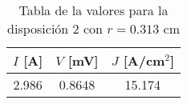 \begin{table}[h!]
    \centering
\begin{tabular}{ccc}
\toprule
$I$ [A] & $V$ [mV] & $J$ [A/cm$^2$] \\
\midrule
2.986 & 0.8648 & 15.174 \\
\bottomrule
\end{tabular}
    \caption{Tabla de la valores para la disposición 2 con $r=0.313$ cm}
    \label{Tab:VIJ_mini_2}
\end{table}

